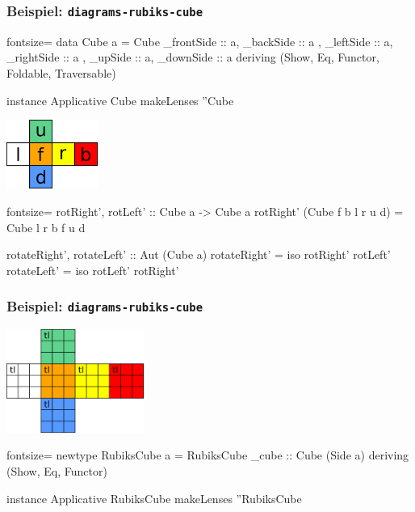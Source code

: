 \documentclass{beamer}
\begin{document}
\begin{frame}[fragile]
  \frametitle{Beispiel: \texttt{diagrams-rubiks-cube}}
  \begin{haskellcode*}{fontsize=\small}
data Cube a = Cube
  { _frontSide :: a,  _backSide :: a
  ,  _leftSide :: a, _rightSide :: a
  ,    _upSide :: a,  _downSide :: a
  } deriving (Show, Eq, Functor, Foldable, Traversable)

instance Applicative Cube
makeLenses ''Cube


  \end{haskellcode*}
  \begin{minipage}{0.3 \linewidth}
    \includegraphics[width=3cm]{cube.png}
  \end{minipage}
  \begin{minipage}{0.67 \linewidth}
    \begin{haskellcode*}{fontsize=\small}
rotRight', rotLeft' :: Cube a -> Cube a
rotRight' (Cube f b l r u d) =
           Cube l r b f u d

rotateRight', rotateLeft' :: Aut (Cube a)
rotateRight' = iso rotRight' rotLeft'
rotateLeft'  = iso rotLeft'  rotRight'
    \end{haskellcode*}
  \end{minipage}
\end{frame}

\begin{frame}[fragile]
  \frametitle{Beispiel: \texttt{diagrams-rubiks-cube}}
  \begin{minipage}{0.43 \linewidth}
    \includegraphics[width=4.5cm]{rubikscube.png}
  \end{minipage}
  \begin{minipage}[b]{0.55 \linewidth}
    \begin{haskellcode*}{fontsize=\small}
newtype RubiksCube a = RubiksCube
  { _cube :: Cube (Side a) }
    deriving (Show, Eq, Functor)

instance Applicative RubiksCube
makeLenses ''RubiksCube
    \end{haskellcode*}
  \end{minipage}
\end{frame}
\end{document}
